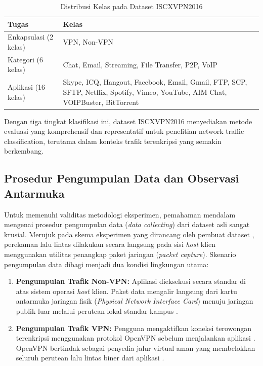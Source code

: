 \begin{table}[h]
    \centering
    \caption{Distribusi Kelas pada Dataset ISCXVPN2016 \citep{park2024fast}}
    \label{tab:dataset_distribution}
    \setlength{\tabcolsep}{6pt} %
    \renewcommand{\arraystretch}{1.2} %
    \begin{tabularx}{\linewidth}{lX}
        \toprule
        \textbf{Tugas} & \textbf{Kelas} \\
        \midrule
        Enkapsulasi (2 kelas) & VPN, Non-VPN \\
        Kategori (6 kelas) & Chat, Email, Streaming, File Transfer, P2P, VoIP \\
        Aplikasi (16 kelas) & Skype, ICQ, Hangout, Facebook, Email, Gmail, FTP, SCP, SFTP, Netflix, Spotify, Vimeo, YouTube, AIM Chat, VOIPBuster, BitTorrent \\
        \bottomrule
    \end{tabularx}
\end{table}

Dengan tiga tingkat klasifikasi ini, dataset ISCXVPN2016 menyediakan metode evaluasi yang komprehensif dan representatif untuk penelitian network traffic classification, terutama dalam konteks trafik terenkripsi yang semakin berkembang.

\subsection{Prosedur Pengumpulan Data dan Observasi Antarmuka}
\label{sec:bab3-prosedur-pengumpulan}

Untuk memenuhi validitas metodologi eksperimen, pemahaman mendalam mengenai prosedur pengumpulan data (\textit{data collecting}) dari dataset asli sangat krusial. Merujuk pada skema eksperimen yang dirancang oleh pembuat dataset \citep{draper2016characterization}, perekaman lalu lintas dilakukan secara langsung pada sisi \textit{host} klien menggunakan utilitas penangkap paket jaringan (\textit{packet capture}). Skenario pengumpulan data dibagi menjadi dua kondisi lingkungan utama:
\begin{enumerate}
    \item \textbf{Pengumpulan Trafik Non-VPN:} Aplikasi dieksekusi secara standar di atas sistem operasi \textit{host} klien. Paket data mengalir langsung dari kartu antarmuka jaringan fisik (\textit{Physical Network Interface Card}) menuju jaringan publik luar melalui perutean lokal standar kampus \citep{draper2016characterization}.
    \item \textbf{Pengumpulan Trafik VPN:} Pengguna mengaktifkan koneksi terowongan terenkripsi menggunakan protokol OpenVPN sebelum menjalankan aplikasi \citep{draper2016characterization}. OpenVPN bertindak sebagai penyedia jalur virtual aman yang membelokkan seluruh perutean lalu lintas biner dari aplikasi \citep{crist2015mastering}.
\end{enumerate}

